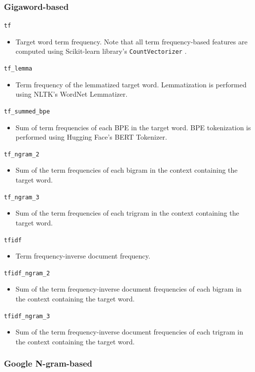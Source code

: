 \documentclass[11pt,a4paper]{article}
\begin{document}
\subsubsection{Gigaword-based}

\texttt{tf}
\begin{itemize}
  \item Target word term frequency. Note that all term frequency-based features are computed using Scikit-learn library's \texttt{CountVectorizer} \citep{pedregosa2011scikit}.
\end{itemize}
\texttt{tf\_lemma}
\begin{itemize}
  \item Term frequency of the lemmatized target word. Lemmatization is performed using NLTK's WordNet Lemmatizer.
\end{itemize}
\texttt{tf\_summed\_bpe}
\begin{itemize}
  \item Sum of term frequencies of each BPE in the target word. BPE tokenization is performed using Hugging Face's BERT Tokenizer.
\end{itemize}
\texttt{tf\_ngram\_2}
\begin{itemize}
  \item Sum of the term frequencies of each bigram in the context containing the target word.
\end{itemize}
\texttt{tf\_ngram\_3}
\begin{itemize}
  \item Sum of the term frequencies of each trigram in the context containing the target word.
\end{itemize}
\texttt{tfidf}
\begin{itemize}
  \item Term frequency-inverse document frequency.
\end{itemize}
\texttt{tfidf\_ngram\_2}
\begin{itemize}
  \item Sum of the term frequency-inverse document frequencies of each bigram in the context containing the target word.
\end{itemize}
\texttt{tfidf\_ngram\_3}
\begin{itemize}
  \item Sum of the term frequency-inverse document frequencies of each trigram in the context containing the target word.
\end{itemize}

\subsubsection{Google N-gram-based}
\end{document}
